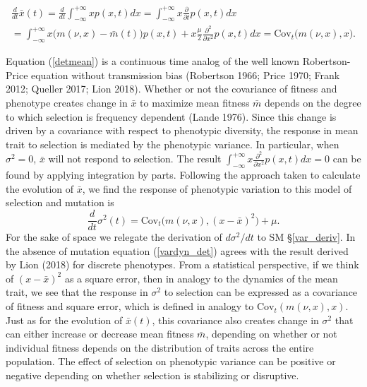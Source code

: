 \documentclass[]{article}
\begin{document}
\begin{multline}\label{detmean}
\frac{d}{dt}\bar x(t)=\frac{d}{dt}\int_{-\infty}^{+\infty} x p(x,t)dx=\int_{-\infty}^{+\infty} x\frac{\partial}{\partial t} p(x,t)dx \\
=\int_{-\infty}^{+\infty} x\big(m(\nu,x)-\bar m(t)\big) p(x,t)+x\frac{\mu}{2}\frac{\partial^2}{\partial x^2} p(x,t)dx
=\mathrm{Cov}_t\Big(m(\nu,x),x\Big).
\end{multline}

Equation (\ref{detmean}) is a continuous time analog of the well known
Robertson-Price equation without transmission bias (Robertson 1966;
Price 1970; Frank 2012; Queller 2017; Lion 2018). Whether or not the
covariance of fitness and phenotype creates change in \(\bar x\) to
maximize mean fitness \(\bar m\) depends on the degree to which
selection is frequency dependent (Lande 1976). Since this change is
driven by a covariance with respect to phenotypic diversity, the
response in mean trait to selection is mediated by the phenotypic
variance. In particular, when \(\sigma^2=0\), \(\bar x\) will not
respond to selection. The result
\(\int_{-\infty}^{+\infty} x\frac{\partial^2}{\partial x^2} p(x,t)dx=0\)
can be found by applying integration by parts. Following the approach
taken to calculate the evolution of \(\bar x\), we find the response of
phenotypic variation to this model of selection and mutation is
\begin{equation}\label{vardyn_det}
\frac{d}{dt}\sigma^2(t)=\mathrm{Cov}_t\Big(m(\nu,x),(x-\bar x)^2\Big)+\mu.
\end{equation} For the sake of space we relegate the derivation of
\(d\sigma^2/dt\) to SM \S\ref{var_deriv}. In the absence of mutation
equation (\ref{vardyn_det}) agrees with the result derived by Lion
(2018) for discrete phenotypes. From a statistical perspective, if we
think of \((x-\bar x)^2\) as a square error, then in analogy to the
dynamics of the mean trait, we see that the response in \(\sigma^2\) to
selection can be expressed as a covariance of fitness and square error,
which is defined in analogy to \(\mathrm{Cov}_t(m(\nu,x),x)\). Just as
for the evolution of \(\bar x(t)\), this covariance also creates change
in \(\sigma^2\) that can either increase or decrease mean fitness
\(\bar m\), depending on whether or not individual fitness depends on
the distribution of traits across the entire population. The effect of
selection on phenotypic variance can be positive or negative depending
on whether selection is stabilizing or disruptive.
\end{document}
